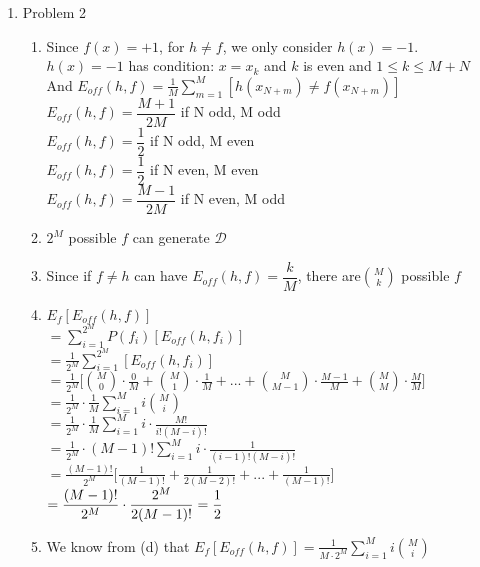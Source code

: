 \documentclass{amsart}
\begin{document}
\begin{enumerate}
\begin{enumerate}
\end{enumerate}
\item Problem 2
\begin{enumerate}
\item Since $f(x)=+1$, for $h\neq f$, we only consider $h(x)=-1$.\\
$h(x)=-1$ has condition: $x=x_k$ and $k$ is even and $1\leq k\leq M+N$\\
And $\displaystyle E_{off}(h,f)=\frac{1}{M}\sum^{M}_{m=1}[h(x_{N+m})\neq f(x_{N+m})]$\\
$E_{off}(h,f) = \dfrac{M+1}{2M}$ if N odd, M odd\\
$E_{off}(h,f) = \dfrac{1}{2}$ if N odd, M even\\
$E_{off}(h,f) = \dfrac{1}{2}$ if N even, M even\\
$E_{off}(h,f) = \dfrac{M-1}{2M}$ if N even, M odd\\
\item $2^M$ possible $f$ can generate $\mathcal{D}$
\item Since if $f\neq h$ can have $E_{off}(h,f)=\dfrac{k}{M}$, there are$\displaystyle\binom Mk$ possible $f$
\item $E_f[E_{off}(h,f)]$\\
$=\displaystyle\sum^{2^M}_{i=1} P(f_i)[E_{off}(h,f_i)]$\\
$=\displaystyle\frac{1}{2^M}\sum^{2^M}_{i=1}[E_{off}(h,f_i)]$\\
$=\displaystyle\frac{1}{2^M}\bigg[\binom M0\cdot \frac{0}{M}+\binom M1\cdot \frac{1}{M}+...+\binom M{M-1}\cdot \frac{M-1}{M}+\binom MM\cdot \frac{M}{M}\bigg]$\\
$=\displaystyle\frac{1}{2^M}\cdot\frac{1}{M}\sum^M_{i=1}i\binom Mi$\\
$=\displaystyle\frac{1}{2^M}\cdot\frac{1}{M}\sum^M_{i=1}i\cdot \frac{M!}{i!(M-i)!}$\\
$=\displaystyle\frac{1}{2^M}\cdot(M-1)!\sum^M_{i=1}i\cdot \frac{1}{(i-1)!(M-i)!}$\\
$=\displaystyle\frac{(M-1)!}{2^M}\bigg[\frac{1}{(M-1)!}+\frac{1}{2(M-2)!}+...+\frac{1}{(M-1)!}\bigg]$\\
$=\displaystyle\frac{(M-1)!}{2^M}\cdot\frac{2^M}{2(M-1)!}\\=\frac{1}{2}$
\item We know from (d) that $E_f[E_{off}(h,f)]=\displaystyle\frac{1}{M\cdot 2^M}\sum^M_{i=1}i\binom Mi$\\

\end{enumerate}
\end{enumerate}
\end{document}
